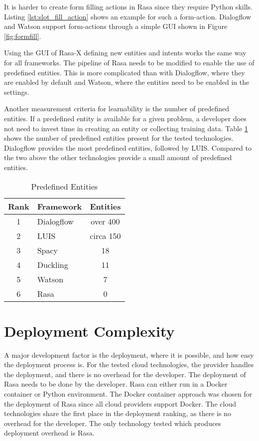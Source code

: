 It is harder to create form filling actions in Rasa since they require Python skills.
Listing \ref{lst:slot_fill_action} shows an example for such a form-action.
Dialogflow and Watson support form-actions through a simple GUI shown in Figure \ref{fig:formfill}.

Using the GUI of Rasa-X defining new entities and intents works the same way for all frameworks.
The pipeline of Rasa needs to be modified to enable the use of predefined entities.
This is more complicated than with Dialogflow, where they are enabled by default and Watson, where the entities need to be enabled in the settings.

Another measurement criteria for learnability is the number of predefined entities.
If a predefined entity is available for a given problem, a developer does not need to invest time in creating an entity or collecting training data. 
Table \ref{tab:predefined_entities} shows the number of predefined entities present for the tested technologies.
Dialogflow provides the most predefined entities, followed by LUIS.
Compared to the two above the other technologies provide a small amount of predefined entities.
\begin{table}[H]
    \centering
    \begin{tabular}{ c | l | c }
        Rank & Framework &  Entities \\ \hline \hline
        1 & \multirow{1}{*}{Dialogflow} & over 400 \\
        2 & \multirow{1}{*}{LUIS} & circa 150 \\
        3 & \multirow{1}{*}{Spacy} & 18 \\
        4 & \multirow{1}{*}{Duckling} & 11 \\
        5 & \multirow{1}{*}{Watson} & 7  \\
        6 & \multirow{1}{*}{Rasa} & 0 \\
    \end{tabular}
    \caption{Predefined Entities} \label{tab:predefined_entities}
\end{table} \noindent

\section*{Deployment Complexity}
A major development factor is the deployment, where it is possible, and how easy the deployment process is.
For the tested cloud technologies, the provider handles the deployment, and there is no overhead for the developer.
The deployment of Rasa needs to be done by the developer.
Rasa can either run in a Docker container or Python environment.
The Docker container approach was chosen for the deployment of Rasa since all cloud providers support Docker.
The cloud technologies share the first place in the deployment ranking, as there is no overhead for the developer.
The only technology tested which produces deployment overhead is Rasa. 

